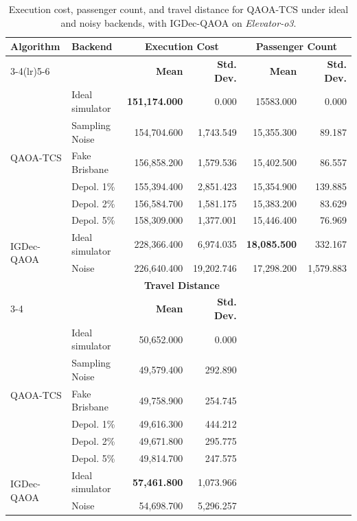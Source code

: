 \begin{table}[ht]
\centering
\caption{Execution cost, passenger count, and travel distance for QAOA-TCS under ideal and noisy backends, with IGDec-QAOA on \textit{Elevator-o3}.}
\label{tab:elevator2_effmetrics}
\scriptsize
\begin{tabular}{llrrrr}
\toprule
\textbf{Algorithm} & \textbf{Backend} &
\multicolumn{2}{c}{\textbf{Execution Cost}} &
\multicolumn{2}{c}{\textbf{Passenger Count}} \\
\cmidrule(lr){3-4}\cmidrule(lr){5-6}
 & & \textbf{Mean} & \textbf{Std. Dev.} & \textbf{Mean} & \textbf{Std. Dev.} \\
\midrule
\multirow{6}{*}{QAOA-TCS}
  & Ideal simulator & \textbf{151,174.000} & 0.000    & 15583.000 & 0.000 \\
  & Sampling Noise   & 154,704.600 & 1,743.549 & 15,355.300 & 89.187 \\
  & Fake Brisbane   & 156,858.200 & 1,579.536 & 15,402.500 & 86.557 \\
  & Depol. 1\%      & 155,394.400 & 2,851.423 & 15,354.900 & 139.885 \\
  & Depol. 2\%      & 156,584.700 & 1,581.175 & 15,383.200 & 83.629 \\
  & Depol. 5\%      & 158,309.000 & 1,377.001 & 15,446.400 & 76.969 \\
\midrule
\multirow{2}{*}{IGDec-QAOA}
  & Ideal simulator & 228,366.400 & 6,974.035 & \textbf{18,085.500} & 332.167 \\
  & Noise           & 226,640.400 & 19,202.746 & 17,298.200 & 1,579.883 \\
\midrule
 & & \multicolumn{2}{c}{\textbf{Travel Distance}} & & \\
\cmidrule(lr){3-4}
 & & \textbf{Mean} & \textbf{Std. Dev.} & & \\
\multirow{6}{*}{QAOA-TCS}
  & Ideal simulator & 50,652.000 & 0.000 & & \\
  & Sampling Noise   & 49,579.400 & 292.890 & & \\
  & Fake Brisbane   & 49,758.900 & 254.745 & & \\
  & Depol. 1\%      & 49,616.300 & 444.212 & & \\
  & Depol. 2\%      & 49,671.800 & 295.775 & & \\
  & Depol. 5\%      & 49,814.700 & 247.575 & & \\
\midrule
\multirow{2}{*}{IGDec-QAOA}
  & Ideal simulator & \textbf{57,461.800} & 1,073.966 & & \\
  & Noise           & 54,698.700 & 5,296.257 & & \\
\bottomrule
\end{tabular}
\end{table}

